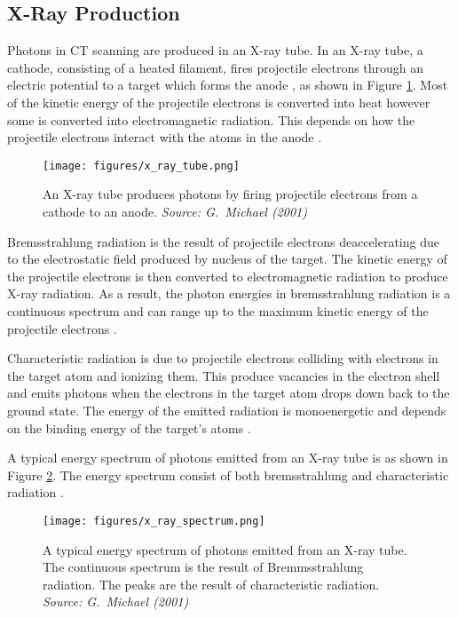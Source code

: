 \documentclass[12pt, a4paper]{memoir}
\begin{document}
\subsection{X-Ray Production}
Photons in CT scanning are produced in an X-ray tube. In an X-ray tube, a cathode, consisting of a heated filament, fires projectile electrons through an electric potential to a target which forms the anode \citep{michael2001x}, as shown in Figure \ref{fig:x_ray_tube}. Most of the kinetic energy of the projectile electrons is converted into heat however some is converted into electromagnetic radiation. This depends on how the projectile electrons interact with the atoms in the anode \citep{cantatore2011introduction}.

\begin{figure}
\centering
\texttt{[image: figures/x\_ray\_tube.png]}
\caption{An X-ray tube produces photons by firing projectile electrons from a cathode to an anode. \emph{Source: G.~Michael (2001) \citep{michael2001x}}}
\label{fig:x_ray_tube}
\end{figure}

Bremsstrahlung radiation is the result of projectile electrons deaccelerating due to the electrostatic field produced by nucleus of the target. The kinetic energy of the projectile electrons is then converted to electromagnetic radiation to produce X-ray radiation. As a result, the photon energies in bremsstrahlung radiation is  a continuous spectrum and can range up to the maximum kinetic energy of the projectile electrons \citep{michael2001x}.

Characteristic radiation is due to projectile electrons colliding with electrons in the target atom and ionizing them. This produce vacancies in the electron shell and emits photons when the electrons in the target atom drops down back to the ground state. The energy of the emitted radiation is monoenergetic and depends on the binding energy of the target's atoms \citep{michael2001x}.

A typical energy spectrum of photons emitted from an X-ray tube is as shown in Figure \ref{fig:x_ray_spectrum}. The energy spectrum consist of both bremsstrahlung and characteristic radiation \citep{michael2001x}.

\begin{figure}
\centering
\texttt{[image: figures/x\_ray\_spectrum.png]}
\caption{A typical energy spectrum of photons emitted from an X-ray tube. The continuous spectrum is the result of Bremmsstrahlung radiation. The peaks are the result of characteristic radiation. \emph{Source: G.~Michael (2001) \citep{michael2001x}}}
\label{fig:x_ray_spectrum}
\end{figure}
\end{document}
